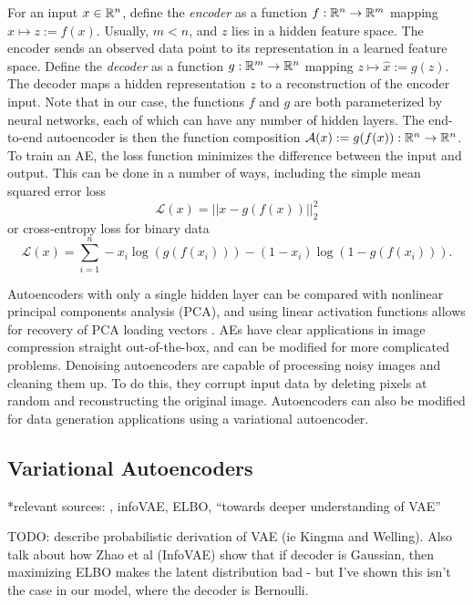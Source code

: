 For an input $x \in \mathbb{R}^n$, define the \textit{encoder} as a function $f: \mathbb{R}^n \to \mathbb{R}^m$ mapping $x \mapsto z := f(x)$. Usually, $m < n$, and $z$ lies in a hidden feature space. The encoder sends an observed data point to its representation in a learned feature space. Define the \textit{decoder} as a function $g: \mathbb{R}^m \to \mathbb{R}^n$ mapping $z \mapsto \hat x := g(z)$. The decoder maps a hidden representation $z$ to a reconstruction of the encoder input. Note that in our case, the functions $f$ and $g$ are both parameterized by neural networks, each of which can have any number of hidden layers. The end-to-end autoencoder is then the function composition $\mathcal{A}(x):= g(f(x)): \mathbb{R}^n \to \mathbb{R}^n$. To train an AE, the loss function minimizes the difference between the input and output. This can be done in a number of ways, including the simple mean squared error loss
\begin{equation}
  \mathcal{L}(x) = || x - g(f(x))||_2^2
  \label{eq:mse}
\end{equation}
or cross-entropy loss for binary data
\begin{equation}
  \mathcal{L}(x) = \sum_{i=1}^n - x_i \log(g(f(x_i))) - (1-x_i)\log(1- g(f(x_i))).
  \label{eq:cross_entropy}
\end{equation}

Autoencoders with only a single hidden layer can be compared with nonlinear principal components analysis (PCA), and using linear activation functions allows for recovery of PCA loading vectors \cite{plaut2018}. AEs have clear applications in image compression straight out-of-the-box, and can be modified for more complicated problems. Denoising autoencoders \cite{vincent2008} are capable of processing noisy images and cleaning them up. To do this, they corrupt input data by deleting pixels at random and reconstructing the original image. Autoencoders can also be modified for data generation applications using a variational autoencoder.

\subsection{Variational Autoencoders}
*relevant sources: \cite{doersch2016} \cite{kingma2014} \cite{Blei2017}, infoVAE, ELBO, ``towards deeper understanding of VAE''

TODO: describe probabilistic derivation of VAE (ie Kingma and Welling). Also talk about how Zhao et al (InfoVAE) show that if decoder is Gaussian, then maximizing ELBO makes the latent distribution bad - but I've shown this isn't the case in our model, where the decoder is Bernoulli.

